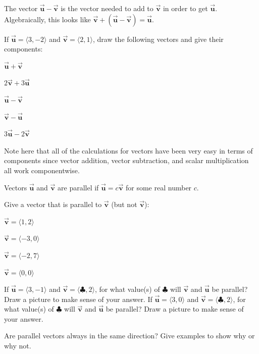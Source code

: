 \begin{info} The vector $\vec{\textbf{u}}- \vec{\textbf{v}}$ is the vector needed to add to $\vec{\textbf{v}}$ in order to get $\vec{\textbf{u}}$. Algebraically, this looks like $\vec{\textbf{v}} +(\vec{\textbf{u}}- \vec{\textbf{v}})=\vec{\textbf{u}}$.
\end{info}

\bq If $\vec{\textbf{u}}=\langle 3,-2\rangle$ and $\vec{\textbf{v}}=\langle 2,1\rangle$, draw the following vectors and give their components:
\be
\item $\vec{\textbf{u}}+ \vec{\textbf{v}}$
\item $2\vec{\textbf{v}}+3 \vec{\textbf{u}}$
\item $\vec{\textbf{u}}- \vec{\textbf{v}}$
\item $\vec{\textbf{v}}- \vec{\textbf{u}}$
\item $3\vec{\textbf{u}}-2 \vec{\textbf{v}}$
\ee
\eq

\begin{info} Note here that all of the calculations for vectors have been very easy in terms of components since vector addition, vector subtraction, and scalar multiplication all work componentwise.

Vectors $\vec{\textbf{u}}$ and $\vec{\textbf{v}}$ are parallel if $\vec{\textbf{u}}= c \vec{\textbf{v}}$ for some real number $c$. \end{info}

\bq Give a vector that is parallel to $\vec{\textbf{v}}$ (but not $\vec{\textbf{v}}$):
\be
\item $\vec{\textbf{v}}= \langle 1,2 \rangle$
\item $\vec{\textbf{v}}= \langle -3,0 \rangle$
\item $\vec{\textbf{v}}= \langle -2,7 \rangle$
\item $\vec{\textbf{v}}= \langle 0,0 \rangle$
\ee
\eq

\bq If $\vec{\textbf{u}}=\langle 3,-1\rangle$ and $\vec{\textbf{v}}=\langle \clubsuit,2\rangle$, for what value(s) of $\clubsuit$ will $\vec{\textbf{v}}$ and $\vec{\textbf{u}}$ be parallel? Draw a picture to make sense of your answer.
\eq
\bq If $\vec{\textbf{u}}=\langle 3,0\rangle$ and $\vec{\textbf{v}}=\langle \clubsuit,2\rangle$, for what value(s) of $\clubsuit$ will $\vec{\textbf{v}}$ and $\vec{\textbf{u}}$ be parallel? Draw a picture to make sense of your answer.
\eq

\bq Are parallel vectors always in the same direction? Give examples to show why or why not. \eq

